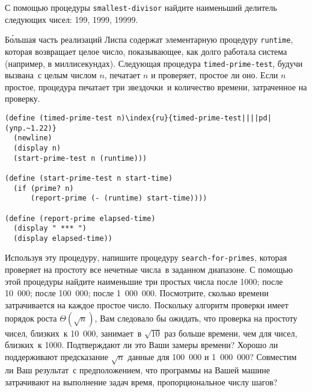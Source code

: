 \begin{exercise}{1.21}\label{EX1.21}%
С помощью процедуры {\tt smallest-divisor}
найдите наименьший делитель следующих чисел: 199, 1999, 19999.
\end{exercise}
\begin{exercise}{1.22}\label{EX1.22}%
Б\'ольшая часть реализаций Лиспа содержат элементарную
процедуру 
{\tt runtime}, которая возвращает целое число,
показывающее, как долго работала система (например, в
миллисекундах). Следующая процедура {\tt timed-prime-test},
будучи вызвана~с целым числом $n$, печатает $n$
и проверяет, простое ли оно. Если $n$ простое, процедура
печатает три звездочки~и количество времени, затраченное на проверку.

\begin{Verbatim}[fontsize=\small]
(define (timed-prime-test n)\index{ru}{timed-prime-test||||pd|(упр.~1.22)}
  (newline)
  (display n)
  (start-prime-test n (runtime)))

(define (start-prime-test n start-time)
  (if (prime? n)
      (report-prime (- (runtime) start-time))))

(define (report-prime elapsed-time)
  (display " *** ")
  (display elapsed-time))
\end{Verbatim}
Используя эту процедуру, напишите процедуру
{\tt search-for-primes}, которая проверяет на простоту
все нечетные числа~в заданном диапазоне. С помощью этой процедуры
найдите наименьшие три простых числа после 1000; после 10~000; после
100~000; после 1~000~000.  Посмотрите, сколько времени затрачивается на
каждое простое число.  Поскольку алгоритм проверки имеет порядок роста 
$\Theta (\sqrt{n})$, Вам следовало бы ожидать, что проверка 
на простоту чисел, близких~к 10~000, занимает~в $\sqrt{10}$
раз больше времени, чем для чисел, близких~к 1000.  Подтверждают ли
это Ваши замеры времени? Хорошо ли поддерживают предсказание
$\sqrt{n}$ данные для 100~000 и 1~000~000?  Совместим ли
Ваш результат~с предположением, что программы на Вашей машине
затрачивают на выполнение задач время, пропорциональное числу шагов?
\end{exercise}

